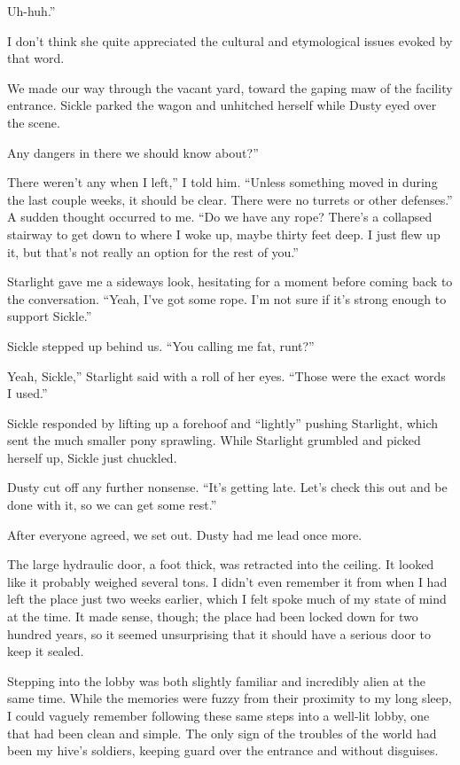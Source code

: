 \leavevmode{}Uh-huh.”

I don’t think she quite appreciated the cultural and etymological issues evoked by that word.

We made our way through the vacant yard, toward the gaping maw of the facility entrance. Sickle parked the wagon and unhitched herself while Dusty eyed over the scene.

\leavevmode{}Any dangers in there we should know about?”

\leavevmode{}There weren’t any when I left,” I told him. “Unless something moved in during the last couple weeks, it should be clear. There were no turrets or other defenses.” A sudden thought occurred to me. “Do we have any rope? There’s a collapsed stairway to get down to where I woke up, maybe thirty feet deep. I just flew up it, but that’s not really an option for the rest of you.”

Starlight gave me a sideways look, hesitating for a moment before coming back to the conversation. “Yeah, I’ve got some rope. I’m not sure if it’s strong enough to support Sickle.”

Sickle stepped up behind us. “You calling me fat, runt?”

\leavevmode{}Yeah, Sickle,” Starlight said with a roll of her eyes. “Those were the exact words I used.”

Sickle responded by lifting up a forehoof and “lightly” pushing Starlight, which sent the much smaller pony sprawling. While Starlight grumbled and picked herself up, Sickle just chuckled.

Dusty cut off any further nonsense. “It’s getting late. Let’s check this out and be done with it, so we can get some rest.”

After everyone agreed, we set out. Dusty had me lead once more.

The large hydraulic door, a foot thick, was retracted into the ceiling. It looked like it probably weighed several tons. I didn’t even remember it from when I had left the place just two weeks earlier, which I felt spoke much of my state of mind at the time. It made sense, though; the place had been locked down for two hundred years, so it seemed unsurprising that it should have a serious door to keep it sealed.

Stepping into the lobby was both slightly familiar and incredibly alien at the same time. While the memories were fuzzy from their proximity to my long sleep, I could vaguely remember following these same steps into a well-lit lobby, one that had been clean and simple. The only sign of the troubles of the world had been my hive’s soldiers, keeping guard over the entrance and without disguises.

